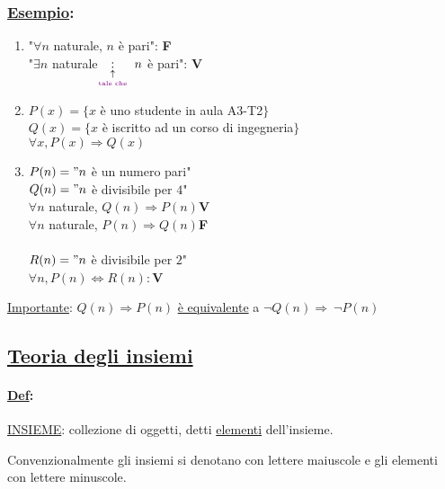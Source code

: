 \documentclass{article}
\newcommand{\ul}[1]{\underline{#1}}
\newcommand{\Def}[2]{\paragraph{\ul{Def}:}#1\\\hspace*{3em}\begin{minipage}{.8\textwidth}#2\end{minipage}}
\newcommand{\Esempio}[1]{\subsubsection*{\ul{Esempio}:}#1}
\begin{document}
\Esempio{
	\begin{enumerate}
		\item "$\forall n$ naturale, $n$ è pari": \textbf{\color{red}F}\\
		      "$\exists n$ naturale$\underset{\underset{\text{\color{violet}tale che}}{\uparrow}}{:}\ n$ è pari": \textbf{\color{green}V}
		\item $P(x)=\{x$ è uno studente in aula A3-T2$\}$\\
		      $Q(x)=\{x$ è iscritto ad un corso di ingegneria$\}$\\
		      $\forall x, P(x)\Rightarrow Q(x)$
		\item $P(n)="n$ è un numero pari"\\
		      $Q(n)="n$ è divisibile per $4$"\\
		      $\forall n$ naturale, $Q(n)\Rightarrow P(n)$\textbf{\color{green}V}\\
		      $\forall n$ naturale, $P(n)\Rightarrow Q(n)$\textbf{\color{red}F}\\\\
		      $R(n)="n$ è divisibile per $2$"\\
		      $\forall n, P(n)\Leftrightarrow R(n):$\textbf{\color{green}V}
	\end{enumerate}
	\ul{Importante}: $Q(n)\Rightarrow P(n)$ \ul{è equivalente} a $\neg Q(n)\Rightarrow\ \neg P(n)$
}

\subsection{\texorpdfstring{\color{blue}\ul{Teoria degli insiemi}}{Teoria degli insiemi}}
\Def{\ul{INSIEME}: collezione di oggetti, detti \ul{elementi} dell'insieme.}
{Convenzionalmente gli insiemi si denotano con lettere maiuscole e gli elementi con lettere minuscole.}
\end{document}
